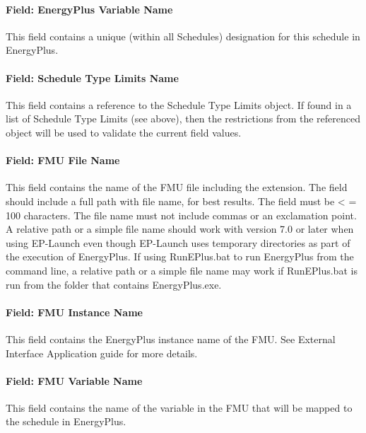 \paragraph{Field: EnergyPlus Variable Name}\label{field-energyplus-variable-name-1}

This field contains a unique (within all Schedules) designation for this schedule in EnergyPlus.

\paragraph{Field: Schedule Type Limits Name}\label{field-schedule-type-limits-name-1}

This field contains a reference to the Schedule Type Limits object. If found in a list of Schedule Type Limits (see above), then the restrictions from the referenced object will be used to validate the current field values.

\paragraph{Field: FMU File Name}\label{field-fmu-file-name-2}

This field contains the name of the FMU file including the extension. The field should include a full path with file name, for best results. The field must be \textless{} = 100 characters. The file name must not include commas or an exclamation point. A relative path or a simple file name should work with version 7.0 or later when using EP-Launch even though EP-Launch uses temporary directories as part of the execution of EnergyPlus. If using RunEPlus.bat to run EnergyPlus from the command line, a relative path or a simple file name may work if RunEPlus.bat is run from the folder that contains EnergyPlus.exe.

\paragraph{Field: FMU Instance Name}\label{field-fmu-instance-name-1}

This field contains the EnergyPlus instance name of the FMU. See External Interface Application guide for more details.

\paragraph{Field: FMU Variable Name}\label{field-fmu-variable-name-1}

This field contains the name of the variable in the FMU that will be mapped to the schedule in EnergyPlus.

